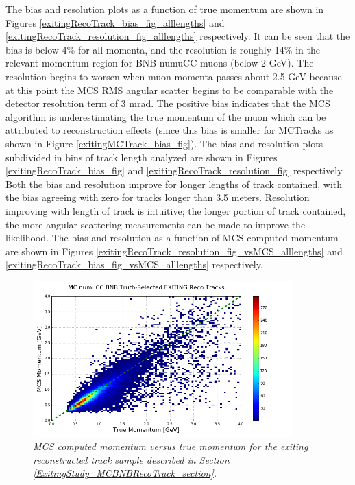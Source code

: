 The bias and resolution plots as a function of true momentum are shown in Figures \ref{exitingRecoTrack_bias_fig_alllengths} and \ref{exitingRecoTrack_resolution_fig_alllengths} respectively. It can be seen that the bias is below 4\% for all momenta, and the resolution is roughly 14\% in the relevant momentum region for BNB numuCC muons (below 2 GeV). The resolution begins to worsen when muon momenta passes about 2.5 GeV because at this point the MCS RMS angular scatter begins to be comparable with the detector resolution term of 3 mrad. The positive bias indicates that the MCS algorithm is underestimating the true momentum of the muon which can be attributed to reconstruction effects (since this bias is smaller for {\sc MCTracks} as shown in Figure \ref{exitingMCTrack_bias_fig}). The bias and resolution plots subdivided in bins of track length analyzed are shown in Figures \ref{exitingRecoTrack_bias_fig} and \ref{exitingRecoTrack_resolution_fig} respectively. Both the bias and resolution improve for longer lengths of track contained, with the bias agreeing with zero for tracks longer than 3.5 meters. Resolution improving with length of track is intuitive; the longer portion of track contained, the more angular scattering measurements can be made to improve the likelihood. The bias and resolution as a function of MCS computed momentum are shown in Figures \ref{exitingRecoTrack_resolution_fig_vsMCS_alllengths} and \ref{exitingRecoTrack_bias_fig_vsMCS_alllengths} respectively.\\


\begin{figure}[ht!]
\begin{center}
\includegraphics[width=100mm]{Figures/MCS_true_comparison_MCBNBRecoTrackExiting.png}
\end{center}
\caption{\textit{MCS computed momentum versus true momentum for the exiting reconstructed track sample described in Section \ref{ExitingStudy_MCBNBRecoTrack_section}.}}
\label{MCS_true_momentum_exiting_RecoTrack_fig}
\end{figure}


